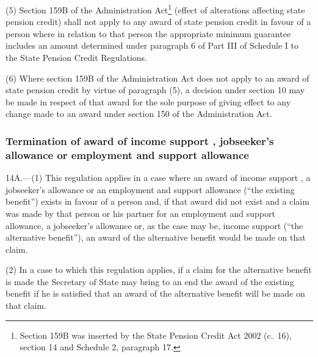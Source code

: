 \documentclass[12pt,a4paper]{article}
\begin{document}
(5) Section 159B of the Administration Act\footnote{Section 159B was inserted by the State Pension Credit Act 2002 (c.\ 16), section 14 and Schedule 2, paragraph 17.} (effect of alterations affecting state pension credit) shall not apply to any award of state pension credit in favour of a person where in relation to that person the appropriate minimum guarantee includes an amount determined under paragraph 6 of Part III of Schedule I to the State Pension Credit Regulations.%

(6) Where section 159B of the Administration Act does not apply to an award of state pension credit by virtue of paragraph (5), a decision under section 10 may be made in respect of that award for the sole purpose of giving effect to any change made to an award under section 150 of the Administration Act.


\subsubsection[14A. Termination of award of income support%
, jobseeker’s allowance or employment and support allowance%
]{Termination of award of income support%
, jobseeker’s allowance or employment and support allowance%
}

14A.---(1)  This regulation applies in a case where an award of income support%
, a jobseeker’s allowance or an employment and support allowance  %
(“the existing benefit”) exists in favour of a person and, if that award did not exist and a claim was made by that person or his partner for 
an employment and support allowance,  %
a jobseeker’s allowance or, as the case may be, income support (“the alternative benefit”), an award of the alternative benefit would be made on that claim.%

(2) In a case to which this regulation applies, if a claim for the alternative benefit is made the Secretary of State may bring to an end the award of the existing benefit if he is satisfied that an award of the alternative benefit will be made on that claim.
\end{document}
